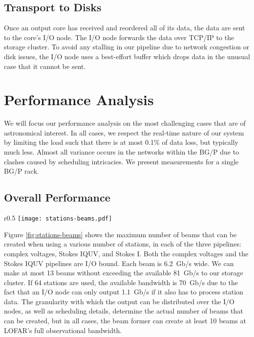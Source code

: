 \documentclass{llncs}
\begin{document}
\subsection{Transport to Disks}
Once an output core has received and reordered all of its data, the data are sent to the core's I/O node. The I/O node forwards the data over TCP/IP to the storage cluster. To avoid any stalling in our pipeline due to network congestion or disk issues, the I/O node uses a best-effort buffer which drops data in the unusual case that it cannot be sent.

\section{Performance Analysis}
\label{Sec:performance}

We will focus our performance analysis on the most challenging cases that are of astronomical interest. In all cases, we respect the real-time nature of our system by limiting the load such that there is at most 0.1\% of data loss, but typically much less. Almost all variance occurs in the networks within the BG/P due to clashes caused by scheduling intricacies. We present measurements for a single BG/P rack.

\subsection{Overall Performance}

\begin{wrapfigure}{r}{0.5\textwidth}
\vspace{-1.65cm}
\texttt{[image: stations-beams.pdf]}
\caption{The maximum number of beams that can be created in various configurations.}
\label{fig:stations-beams}
\vspace{-1cm}
\end{wrapfigure}

Figure \ref{fig:stations-beams} shows the maximum number of beams that can be created when using a various number of stations, in each of the three pipelines: complex voltages, Stokes IQUV, and Stokes I. Both the complex voltages and the Stokes IQUV pipelines are I/O bound. Each beam is 6.2~Gb/s wide. We can make at most 13 beams without exceeding the available 81~Gb/s to our storage cluster. If 64 stations are used, the available bandwidth is 70~Gb/s due to the fact that an I/O node can only output 1.1~Gb/s if it also has to process station data. The granularity with which the output can be distributed over the I/O nodes, as well as scheduling details, determine the actual number of beams that can be created, but in all cases, the beam former can create at least 10 beams at LOFAR's full observational bandwidth.
\end{document}
